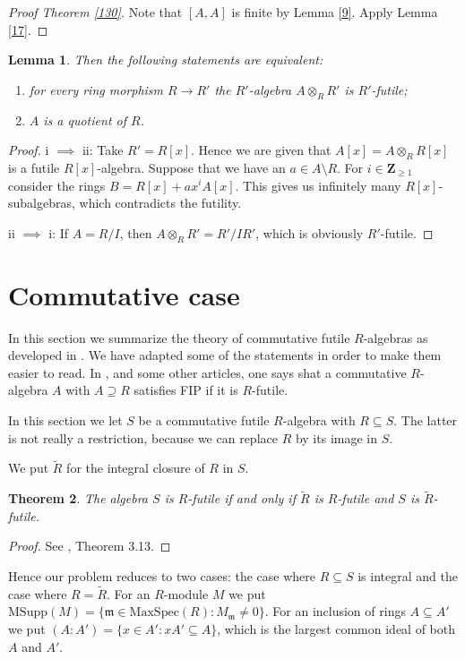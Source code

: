 \documentclass{amsart}
\theoremstyle{plain}
\newtheorem{theorem}{Theorem}[section]
\newtheorem{lemma}[theorem]{Lemma}
\theoremstyle{definition}
\begin{document}
\begin{proof}[Proof Theorem \ref{130}]
Note that $[A,A]$ is finite by Lemma \ref{9}. Apply Lemma \ref{17}. 
\end{proof}

\begin{lemma}
Then the following statements are equivalent:
\begin{enumerate}
\item
for every ring morphism $R \to R'$ the $R'$-algebra $A \otimes_R R'$ is $R'$-futile;
\item
$A$ is a quotient of $R$.
\end{enumerate}
\end{lemma}
\begin{proof}
i $\implies$ ii: Take $R'=R[x]$. Hence we are given that $A[x]=A \otimes_R R[x]$ is a futile $R[x]$-algebra. Suppose that we have an $a \in A \setminus R$. For $i \in {\mathbf{Z}}_{\geq 1}$ consider the rings $B=R[x]+ax^i A[x]$. This gives us
infinitely many $R[x]$-subalgebras, which contradicts the futility. 

ii $\implies$ i: If $A=R/I$, then $A \otimes_R R' = R'/IR'$, which is obviously $R'$-futile.
\end{proof}

\section{Commutative case} \label{66}

In this section we summarize the theory of commutative futile $R$-algebras as developed in \cite{DO5}. We have adapted some of the statements 
in order to make them easier to read. 
In \cite{DO5}, and some other articles, one says shat a commutative $R$-algebra $A$ with $A \supseteq R$ satisfies FIP if it is $R$-futile.

In this section we let $S$ be a commutative futile $R$-algebra with $R \subseteq S$. The latter is not really a
restriction, because we can replace $R$ by its image in $S$. 

We put $\tilde{R}$ for the integral closure of $R$ in $S$.
\begin{theorem}
The algebra $S$ is $R$-futile if and only if $\tilde{R}$ is $R$-futile and
$S$ is $\tilde{R}$-futile. 
\end{theorem}
\begin{proof}
 See \cite{DO5}, Theorem 3.13. 
\end{proof}

Hence our problem reduces to two cases: the case where $R \subseteq S$ is integral and the case where $R=\tilde{R}$. For an $R$-module $M$ we
put $\mathrm{MSupp}(M)=\{{\mathfrak{m}} \in \mathrm{MaxSpec}(R): M_{\mathfrak{m}} \neq 0\}$. For an inclusion of rings $A \subseteq A'$ we put $(A:A')=\{ x \in A':
xA' \subseteq A\}$, which is the largest common ideal of both $A$ and $A'$. 
\end{document}
